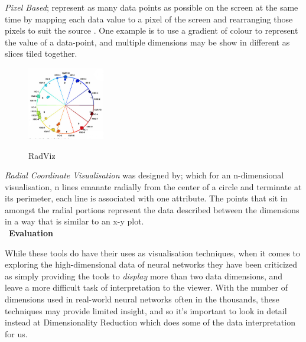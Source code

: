 \documentclass[a4paper,11pt,titlepage]{article}
\begin{document}
		\textit{Pixel Based}; represent as many data points as possible on the screen at the same time by mapping each data value to a pixel of the screen and rearranging those pixels to suit the source \cite{Keim2000}. One example is to use a gradient of colour to represent the value of a data-point, and multiple dimensions may be show in different as slices tiled together.
		\par 
		 		
	\begin{figure}[H]
    			\centering	
			{{\includegraphics[width=0.3\textwidth]
    				{img/battista_vertices} 
    			}}%
    			\caption{RadViz}%
    		\label{fig:lascaux}
	\end{figure}	 		
 		
 		
		\textit{Radial Coordinate Visualisation} was designed by\cite{Hoffman1999}; which for an n-dimensional visualisation, n lines emanate radially from the center of a circle and terminate at its perimeter, each line is associated with one attribute. The points that sit in amongst the radial portions represent the data described between the dimensions in a way that is similar to an x-y plot.
		\\\
	\textbf{Evaluation}
	\par 
	While these tools do have their uses as visualisation techniques, when it comes to exploring the high-dimensional data of neural networks they have been criticized \cite{Maaten2008} as simply providing the tools to \textit{display} more than two data dimensions, and leave a more difficult task of interpretation to the viewer. With the number of dimensions used in real-world neural networks often in the thousands, these techniques may provide limited insight, and so it's important to look in detail instead at Dimensionality Reduction which does some of the data interpretation for us.
\\\
\end{document}
